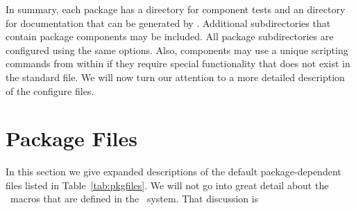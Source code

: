 In summary, each package has a  directory for component
tests and an  directory for documentation that can be generated by \doxygen.
Additional subdirectories that contain package components may
be included.  All package subdirectories are configured using the same
options.  Also, components may use a unique scripting commands from within
 if they require special functionality that does not
exist in the standard  file.  We will now turn our
attention to a more detailed description of the configure files.


\section{Package Files}
\label{sec:package_files}
In this section we give expanded descriptions of the default
package-dependent files listed in Table~\ref{tab:pkgfiles}.  We will
not go into great detail about the \cmake\ macros that are defined in the \draco\ system.  That discussion is

